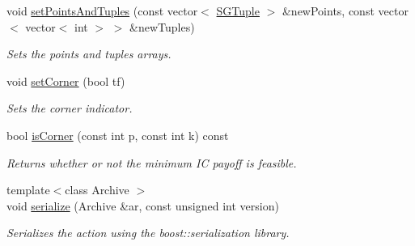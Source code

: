 \begin{DoxyCompactItemize}
void \hyperlink{classSGBaseAction_a991a8308a219ca7fadce3dcd5ae4ca71}{set\+Points\+And\+Tuples} (const vector$<$ \hyperlink{classSGTuple}{S\+G\+Tuple} $>$ \&new\+Points, const vector$<$ vector$<$ int $>$ $>$ \&new\+Tuples)
\begin{DoxyCompactList}\small\item\em Sets the points and tuples arrays. \end{DoxyCompactList}\item 
void \hyperlink{classSGBaseAction_a42092d69ccab82c32d31e2f762b669bd}{set\+Corner} (bool tf)
\begin{DoxyCompactList}\small\item\em Sets the corner indicator. \end{DoxyCompactList}\item 
\mbox{\label{classSGBaseAction_ab46bc1f281b01c7289b2e7e68e64c4ac}} 
bool \hyperlink{classSGBaseAction_ab46bc1f281b01c7289b2e7e68e64c4ac}{is\+Corner} (const int p, const int k) const
\begin{DoxyCompactList}\small\item\em Returns whether or not the minimum IC payoff is feasible. \end{DoxyCompactList}\item 
\mbox{\label{classSGBaseAction_a785478b3bafafb9cc502f92ec54a3b68}} 
{\footnotesize template$<$class Archive $>$ }\\void \hyperlink{classSGBaseAction_a785478b3bafafb9cc502f92ec54a3b68}{serialize} (Archive \&ar, const unsigned int version)
\begin{DoxyCompactList}\small\item\em Serializes the action using the boost\+::serialization library. \end{DoxyCompactList}\end{DoxyCompactItemize}
